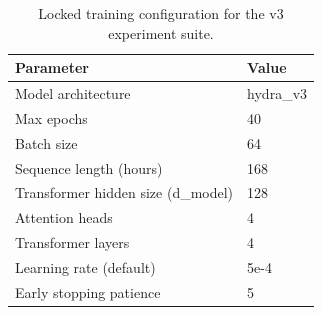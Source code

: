 \begin{table}
\centering
\caption{Locked training configuration for the v3 experiment suite.}
\small
\begin{tabular}{ll}
\toprule
\textbf{Parameter} & \textbf{Value} \\
\midrule
Model architecture & hydra\_v3 \\
Max epochs & 40 \\
Batch size & 64 \\
Sequence length (hours) & 168 \\
Transformer hidden size (d\_model) & 128 \\
Attention heads & 4 \\
Transformer layers & 4 \\
Learning rate (default) & 5e-4 \\
Early stopping patience & 5 \\
\bottomrule
\end{tabular}
\label{tab:training_config}
\end{table}
